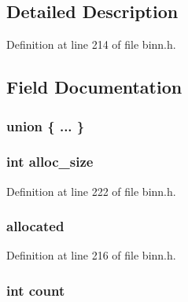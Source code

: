 \subsection{Detailed Description}


Definition at line 214 of file binn.\+h.



\subsection{Field Documentation}
\subsubsection[{\texorpdfstring{"@1}{@1}}]{\setlength{\rightskip}{0pt plus 5cm}union \{ ... \} }\hypertarget{structbinn__struct_a34fb4ebc1b24830e8b4a67535a6dac11}{}\label{structbinn__struct_a34fb4ebc1b24830e8b4a67535a6dac11}
\subsubsection[{\texorpdfstring{alloc\+\_\+size}{alloc_size}}]{\setlength{\rightskip}{0pt plus 5cm}int alloc\+\_\+size}\hypertarget{structbinn__struct_a43ab546b0fdc85de9d25d62dc4564e62}{}\label{structbinn__struct_a43ab546b0fdc85de9d25d62dc4564e62}


Definition at line 222 of file binn.\+h.

\subsubsection[{\texorpdfstring{allocated}{allocated}}]{ allocated}\hypertarget{structbinn__struct_aff03b6df54fff7135a4185aa7065cb7d}{}\label{structbinn__struct_aff03b6df54fff7135a4185aa7065cb7d}


Definition at line 216 of file binn.\+h.

\subsubsection[{\texorpdfstring{count}{count}}]{\setlength{\rightskip}{0pt plus 5cm}int count}\hypertarget{structbinn__struct_ad43c3812e6d13e0518d9f8b8f463ffcf}{}\label{structbinn__struct_ad43c3812e6d13e0518d9f8b8f463ffcf}


